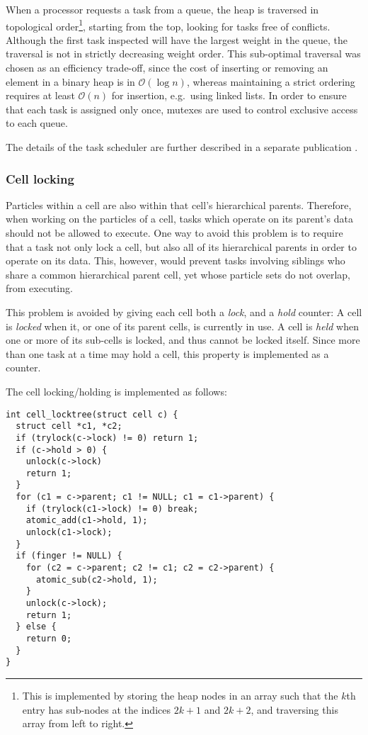 \documentclass[final]{siamltex}
\newcommand{\oh}[1]
    {\mbox{$ {\mathcal O}( #1 ) $}}
\begin{document}
When a processor requests a task from a queue, the heap is
traversed in topological order\footnote{
This is implemented by storing the heap nodes in an array such that the $k$th
entry has sub-nodes at the indices $2k+1$ and $2k+2$, and traversing
this array from left to right.}, starting from the top, looking
for tasks free of conflicts.
Although the first task inspected will have the largest weight
in the queue, the traversal is not in strictly decreasing weight
order.
This sub-optimal traversal was chosen as an efficiency trade-off,
since the cost of inserting or removing an element in a binary heap is in
\oh{\log n}, whereas maintaining a strict ordering requires
at least \oh{n} for insertion, e.g.~using linked lists.
In order to ensure that each task is assigned only once, mutexes
are used to control exclusive access to each queue.

The details of the task scheduler are further described in a separate
publication \cite{ref:Gonnet2013b}.


\subsubsection{Cell locking}
\label{sec:locking}

Particles within a cell are also within that cell's hierarchical
parents.
Therefore, when working on the particles of a cell, tasks which
operate on its parent's data should not be allowed to execute.
One way to avoid this problem is to require that a task
not only lock a cell, but also all of its hierarchical
parents in order to operate on its data.
This, however, would prevent tasks involving siblings who share
a common hierarchical parent cell, yet
whose particle sets do not overlap, from executing.

This problem is avoided by giving each cell both a {\em lock},
and a {\em hold} counter:
A cell is {\em locked} when it, or one of its parent cells, is currently
in use. A cell is {\em held} when one or more of its sub-cells is locked,
and thus cannot be locked itself.
Since more than one task at a time may hold a cell, this property
is implemented as a counter.

The cell locking/holding is implemented as follows:
        
\begin{center}\begin{minipage}{0.8\textwidth}
    \begin{lstlisting}
int cell_locktree(struct cell c) {
  struct cell *c1, *c2;
  if (trylock(c->lock) != 0) return 1;
  if (c->hold > 0) {
    unlock(c->lock)
    return 1;
  }
  for (c1 = c->parent; c1 != NULL; c1 = c1->parent) {
    if (trylock(c1->lock) != 0) break;
    atomic_add(c1->hold, 1);
    unlock(c1->lock);
  }
  if (finger != NULL) {
    for (c2 = c->parent; c2 != c1; c2 = c2->parent) {
      atomic_sub(c2->hold, 1);
    }
    unlock(c->lock);
    return 1;
  } else {
    return 0;
  }
}
    \end{lstlisting}
\end{minipage}\end{center}
\end{document}
